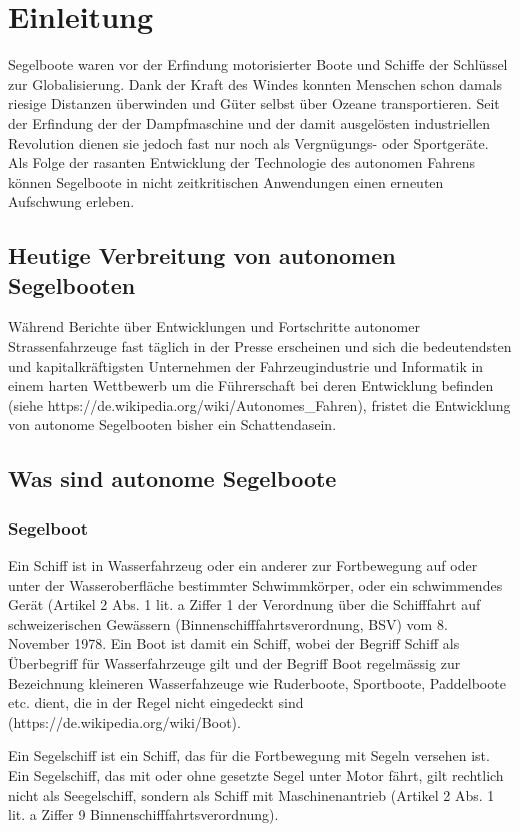 
\chapter{Einleitung }
\label{chap:einleitung}
Segelboote waren vor der Erfindung motorisierter Boote und Schiffe der Schlüssel zur Globalisierung. Dank der Kraft des Windes konnten Menschen schon damals riesige Distanzen überwinden und Güter selbst über Ozeane transportieren. Seit der Erfindung der der Dampfmaschine und der damit ausgelösten industriellen Revolution dienen sie jedoch fast nur noch als Vergnügungs- oder Sportgeräte. Als Folge der rasanten Entwicklung der Technologie des autonomen Fahrens können Segelboote in nicht zeitkritischen Anwendungen einen erneuten Aufschwung erleben.


\section{Heutige Verbreitung von autonomen Segelbooten}
Während Berichte über Entwicklungen und Fortschritte autonomer Strassenfahrzeuge fast täglich in der Presse erscheinen und sich die bedeutendsten und kapitalkräftigsten Unternehmen der Fahrzeugindustrie und Informatik in einem harten Wettbewerb um die Führerschaft bei deren Entwicklung befinden (siehe https://de.wikipedia.org/wiki/Autonomes\_Fahren), fristet die Entwicklung von autonome Segelbooten bisher ein Schattendasein. 

\section{Was sind autonome Segelboote}
\subsection{Segelboot}
Ein Schiff ist in Wasserfahrzeug oder ein anderer zur Fortbewegung auf oder unter der Wasseroberfläche bestimmter Schwimmkörper, oder ein schwimmendes Gerät (Artikel 2 Abs. 1 lit. a Ziffer 1 der Verordnung über die Schifffahrt auf schweizerischen Gewässern (Binnenschifffahrtsverordnung, BSV) vom 8. November 1978. Ein Boot ist damit ein Schiff, wobei der Begriff Schiff als Überbegriff für Wasserfahrzeuge gilt und der Begriff Boot regelmässig zur Bezeichnung kleineren Wasserfahzeuge wie Ruderboote, Sportboote, Paddelboote etc. dient, die in der Regel nicht eingedeckt sind (https://de.wikipedia.org/wiki/Boot). 

Ein Segelschiff ist ein Schiff, das für die Fortbewegung mit Segeln versehen ist. Ein Segelschiff, das mit oder ohne gesetzte Segel unter Motor fährt, gilt rechtlich nicht als Seegelschiff, sondern als Schiff mit Maschinenantrieb (Artikel 2 Abs. 1 lit. a Ziffer 9 Binnenschifffahrtsverordnung). 

